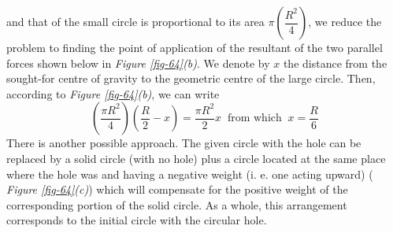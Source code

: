 \documentclass[a4paper,sfsidenotes]{tufte-book}
\begin{document}
and that of the small circle is proportional to its area $\pi \left( \dfrac{R^{2}}{4} \right)$, we reduce the problem to finding the point of application of the resultant of the two parallel forces shown below in \emph{Figure \ref{fig-64}(b)}. We denote by $x$ the distance from the sought-for centre of gravity to the geometric centre of the large circle. Then, according to \emph{Figure \ref{fig-64}(b)}, we can write 
\begin{equation*}%
\left( \frac{\pi R^{2}}{4} \right) \left( \frac{R}{2} -x \right) = \frac{\pi R^{2}}{2} x \;\; \text{from which} \;\; x=\frac{R}{6}
\end{equation*}
There is another possible approach. The given circle with the hole can be replaced by a solid circle (with no hole) plus a circle located at the same place where the hole was and having a negative weight (i. e. one acting upward) ( \emph{Figure \ref{fig-64}(c)}) which will compensate for the positive weight of the corresponding portion of the solid circle. As a whole, this arrangement corresponds to the initial circle with the circular hole.
\end{document}
